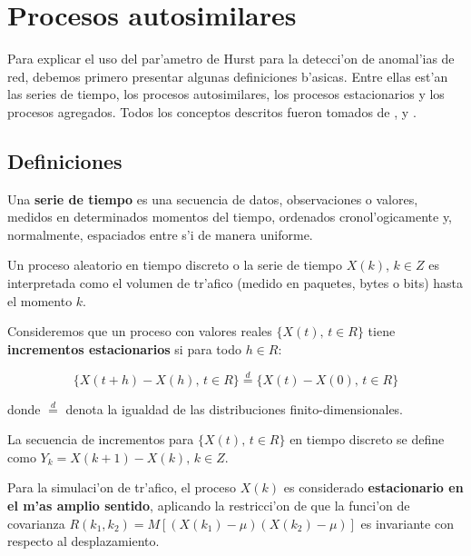 \vspace{5 mm}


\section{Procesos autosimilares} \label{sect:procesos}

Para explicar el uso del par'ametro de Hurst para la detecci'on de anomal'ias
de red, debemos primero presentar algunas definiciones b'asicas. Entre ellas
est'an las series de tiempo, los procesos autosimilares, los procesos
estacionarios y los procesos agregados. Todos los conceptos descritos fueron
tomados de \cite{556987}, \cite{1296068} y
\cite{willingerpaxsonrieditaqqulrddnt}.

\subsection{Definiciones} \label{subsect:defprop}

\begin{definicion} \label{def:xt}
Una {\bf serie de tiempo} es una secuencia de datos, observaciones o valores, 
medidos en determinados momentos del tiempo, ordenados cronol'ogicamente y,
normalmente, espaciados entre s'i de manera uniforme.
\end{definicion}

Un proceso aleatorio en tiempo discreto o la serie de tiempo $X(k)$, $k \in Z$
es interpretada como el volumen de tr'afico (medido en paquetes, bytes o bits)
hasta el momento $k$.

\begin{definicion} \label{def:increstacionario}
Consideremos que un proceso con valores reales $\{X(t) \text{,  } t \in R\}$ 
tiene {\bf incrementos estacionarios} si para todo $h \in R$:

\begin{equation} \label{def:stationaryincrements}
\{X(t + h) - X(h) \text{,  } t \in R \} \stackrel{d}{=} \{X(t) - X(0) \text{,  } t \in R \}
\end{equation}

donde $\stackrel{d}{=}$ denota la igualdad de las distribuciones
finito-dimensionales.
\end{definicion}

La secuencia de incrementos para $\{ X(t) \text{, } t \in R \}$ en tiempo
discreto se define como $Y_k = X(k + 1) - X(k) \text{, } k \in Z$.

\begin{definicion} \label{def:increstacionarioamplio}
Para la simulaci'on de tr'afico, el proceso $X(k)$ es considerado {\bf
estacionario en el m'as amplio sentido}, aplicando la restricci'on de que la
funci'on de covarianza $R(k_1, k_2) = M [(X(k_1) - \mu)(X(k_2) -\mu)]$ es
invariante con respecto al desplazamiento.
\end{definicion}

